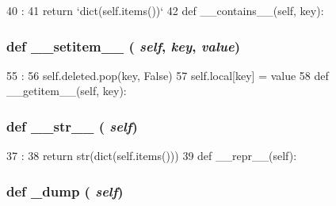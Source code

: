 \begin{DoxyCode}
40                       :
41         return `dict(self.items())`
42 
    def __contains__(self, key):
\end{DoxyCode}
\hypertarget{classm5_1_1util_1_1multidict_1_1multidict_a09195b01147e970ca71c48b57f653940}{
\subsubsection[{\_\-\_\-setitem\_\-\_\-}]{\setlength{\rightskip}{0pt plus 5cm}def \_\-\_\-setitem\_\-\_\- ( {\em self}, \/   {\em key}, \/   {\em value})}}
\label{classm5_1_1util_1_1multidict_1_1multidict_a09195b01147e970ca71c48b57f653940}



\begin{DoxyCode}
55                                      :
56         self.deleted.pop(key, False)
57         self.local[key] = value
58 
    def __getitem__(self, key):
\end{DoxyCode}
\hypertarget{classm5_1_1util_1_1multidict_1_1multidict_aa7a4b9bc0941308e362738503137460e}{
\subsubsection[{\_\-\_\-str\_\-\_\-}]{\setlength{\rightskip}{0pt plus 5cm}def \_\-\_\-str\_\-\_\- ( {\em self})}}
\label{classm5_1_1util_1_1multidict_1_1multidict_aa7a4b9bc0941308e362738503137460e}



\begin{DoxyCode}
37                      :
38         return str(dict(self.items()))
39 
    def __repr__(self):
\end{DoxyCode}
\hypertarget{classm5_1_1util_1_1multidict_1_1multidict_aa00b91ba1bb41693f7b2e8cb357833a1}{
\subsubsection[{\_\-dump}]{\setlength{\rightskip}{0pt plus 5cm}def \_\-dump ( {\em self})}}
\label{classm5_1_1util_1_1multidict_1_1multidict_aa00b91ba1bb41693f7b2e8cb357833a1}



